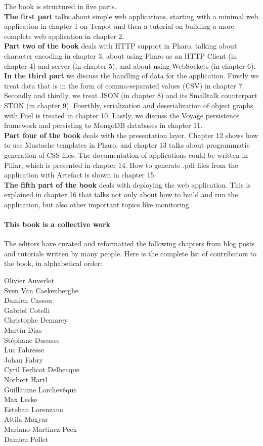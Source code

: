 \documentclass[10pt,twoside,english,showtrims]{support/latex/sbabook/sbabook}
\begin{document}
The book is structured in five parts.\\
\textbf{The first part} talks about simple web applications, starting
with a minimal web application in chapter 1 on Teapot and then a
tutorial on building a more complete web application in chapter 2.\\
\textbf{Part two of the book} deals with HTTP support in Pharo,
talking about character encoding in chapter 3, about using Pharo as an
HTTP Client (in chapter 4) and server (in chapter 5), and about using
WebSockets (in chapter 6).\\
\textbf{In the third part} we discuss the handling of data for the
application. Firstly we treat data that is in the form of
comma-separated values (CSV) in chapter 7. Secondly and thirdly, we
treat JSON (in chapter 8) and its Smalltalk counterpart STON (in
chapter 9). Fourthly, serialization and deserialization of object
graphs with Fuel is treated in chapter 10. Lastly, we discuss the
Voyage persistence framework and persisting to MongoDB databases in
chapter 11.\\
\textbf{Part four of the book} deals with the presentation layer.
Chapter 12 shows how to use Mustache templates in Pharo, and chapter
13 talks about programmatic generation of CSS files. The documentation
of applications could be written in Pillar, which is presented in
chapter 14. How to generate .pdf files from the application with
Artefact is shown in chapter 15.\\
\textbf{The fifth part of the book} deals with deploying the web
application. This is explained in chapter 16 that talks not only about
how to build and run the application, but also other important topics
like monitoring.

\paragraph{This book is a collective work}
The editors have curated and reformatted the following chapters from blog posts
and tutorials written by many people. Here is the complete list of contributors
to the book, in alphabetical order:

\begin{multicols}{3}
Olivier Auverlot\\
Sven Van Caekenberghe\\
Damien Cassou\\
Gabriel Cotelli\\
Christophe Demarey\\
Martín Dias\\
Stéphane Ducasse\\
Luc Fabresse\\
Johan Fabry\\
Cyril Ferlicot Delbecque\\
Norbert Hartl\\
Guillaume Larchevêque\\
Max Leske\\
Esteban Lorenzano\\
Attila Magyar\\
Mariano Martinez-Peck\\
Damien Pollet\\
\end{multicols}
\end{document}
